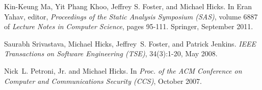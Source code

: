 \documentclass[11pt]{article}
\begin{document}
\begin{description}



     
\item Kin-Keung Ma, Yit Phang Khoo,
  Jeffrey S. Foster, and Michael Hicks.
  In Eran Yahav, editor,
  {\em Proceedings of the Static Analysis Symposium (SAS)}, volume 6887 of
  {\em Lecture Notes in Computer Science}, pages 95-111. Springer, September
  2011.
    
   
 \item Saurabh Srivastava, Michael Hicks, Jeffrey~S. Foster, and
   Patrick Jenkins.
   {\em IEEE Transactions on Software Engineering (TSE)},
   34(3):1-20, May 2008.


 \item Nick~L. Petroni, Jr. and Michael Hicks.
   In {\em Proc. of the
     {ACM} Conference on Computer and Communications Security (CCS)},
   October 2007. 



\end{description}
\end{document}
